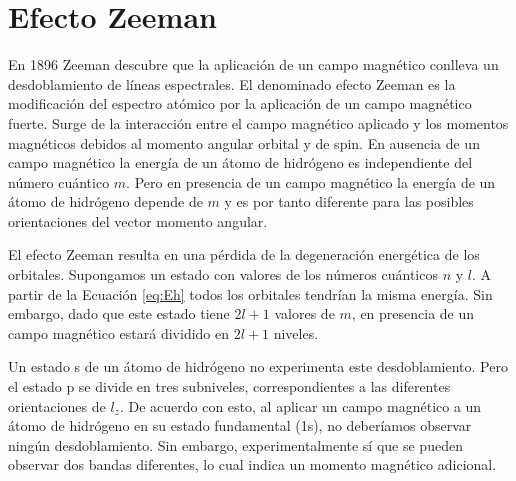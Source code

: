 
\section{Efecto Zeeman}
En 1896 Zeeman descubre que la aplicación de un campo magnético conlleva un
desdoblamiento de líneas espectrales. El denominado efecto Zeeman es la 
modificación del espectro atómico por la aplicación de un campo magnético
fuerte. Surge de la interacción entre el campo magnético aplicado y los
momentos magnéticos debidos al momento angular orbital y de spin. 
En ausencia de un campo magnético la energía de un átomo de hidrógeno es
independiente del número cuántico $m$. Pero en presencia de un campo magnético
la energía de un átomo de hidrógeno depende de $m$ y es por tanto diferente 
para las posibles orientaciones del vector momento angular. 

El efecto Zeeman resulta en una pérdida de la degeneración energética
de los orbitales. Supongamos un estado con valores de los números 
cuánticos $n$  y $l$. A partir de la Ecuación \ref{eq:Eh} todos los
orbitales tendrían la misma energía. Sin embargo, dado que este estado
tiene $2l+1$ valores de $m$, en presencia de un campo magnético estará 
dividido en $2l+1$ niveles. 

Un estado s de un átomo de hidrógeno no experimenta este desdoblamiento.
Pero el estado p se divide en tres subniveles, correspondientes
a las diferentes orientaciones de $l_z$. De acuerdo con esto, al aplicar 
un campo magnético a un átomo de hidrógeno en su estado fundamental (1s), 
no deberíamos observar ningún desdoblamiento. Sin embargo, experimentalmente
sí que se pueden observar dos bandas diferentes, lo cual indica un momento
magnético adicional.

